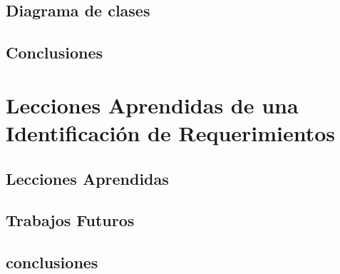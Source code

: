 \documentclass{report}
\begin{document}
    \section{Diagrama de clases}
    
    \section{Conclusiones}
       
\chapter{Lecciones Aprendidas de una Identificación de Requerimientos}
    
    \section{Lecciones Aprendidas}
    
    \section{Trabajos Futuros}
    
    \section{conclusiones}
\end{document}
